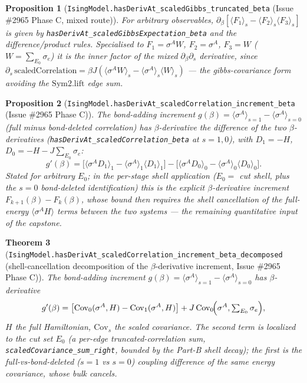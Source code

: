 \documentclass[a4paper,11pt]{article}
\newtheorem{theorem}{Theorem}
\newtheorem{proposition}[theorem]{Proposition}
\begin{document}
\begin{proposition}[\texttt{IsingModel.hasDerivAt\_scaledGibbs\_truncated\_beta}
(Issue \#2965 Phase C, mixed route)]
For arbitrary observables, $\partial_\beta[\langle F_1\rangle_s-\langle
F_2\rangle_s\langle F_3\rangle_s]$ is given by
\texttt{hasDerivAt\_scaledGibbsExpectation\_beta} and the difference/product rules.
Specialised to $F_1=\sigma^A W$, $F_2=\sigma^A$, $F_3=W$ ($W=\sum_{E_0}\sigma_e$) it
is the inner factor of the mixed $\partial_\beta\partial_s$ derivative, since
$\partial_s\,\mathrm{scaledCorrelation}=\beta J(\langle\sigma^A
W\rangle_s-\langle\sigma^A\rangle_s\langle W\rangle_s)$ --- the gibbs-covariance
form avoiding the $\mathrm{Sym2.lift}$ edge sum.
\end{proposition}

\begin{proposition}[\texttt{IsingModel.hasDerivAt\_scaledCorrelation\_increment\_beta}
(Issue \#2965 Phase C)]
The bond-adding increment $g(\beta)=\langle\sigma^A\rangle_{s=1}-\langle\sigma^A\rangle_{s=0}$
(full minus bond-deleted correlation) has $\beta$-derivative the difference of the
two $\beta$-derivatives (\texttt{hasDerivAt\_scaledCorrelation\_beta} at $s=1,0$),
with $D_1=-H$, $D_0=-H-J\sum_{E_0}\sigma_e$:
\[
  g'(\beta)=\bigl[\langle\sigma^A D_1\rangle_1-\langle\sigma^A\rangle_1\langle D_1\rangle_1\bigr]
    -\bigl[\langle\sigma^A D_0\rangle_0-\langle\sigma^A\rangle_0\langle D_0\rangle_0\bigr].
\]
Stated for arbitrary $E_0$; in the per-stage shell application ($E_0=$ cut shell,
plus the $s=0$ bond-deleted identification) this is the explicit $\beta$-derivative
increment $F_{k+1}(\beta)-F_k(\beta)$, whose bound then requires the shell
cancellation of the full-energy $\langle\sigma^A H\rangle$ terms between the two
systems --- the remaining quantitative input of the capstone.
\end{proposition}

\begin{theorem}[\texttt{IsingModel.hasDerivAt\_scaledCorrelation\_increment\_beta\_decomposed}
(shell-cancellation decomposition of the $\beta$-derivative increment, Issue \#2965 Phase C)]
The bond-adding increment $g(\beta)=\langle\sigma^A\rangle_{s=1}-\langle\sigma^A\rangle_{s=0}$
has $\beta$-derivative
\[
  g'(\beta) = \bigl[\mathrm{Cov}_0(\sigma^A,H)-\mathrm{Cov}_1(\sigma^A,H)\bigr]
    + J\,\mathrm{Cov}_0\!\Bigl(\sigma^A,\textstyle\sum_{E_0}\sigma_e\Bigr),
\]
$H$ the full Hamiltonian, $\mathrm{Cov}_s$ the scaled covariance. The second term is
localized to the cut set $E_0$ (a per-edge truncated-correlation sum,
\texttt{scaledCovariance\_sum\_right}, bounded by the Part-B shell decay); the first
is the full-vs-bond-deleted ($s=1$ vs $s=0$) coupling difference of the same energy
covariance, whose bulk cancels.
\end{theorem}
\end{document}
